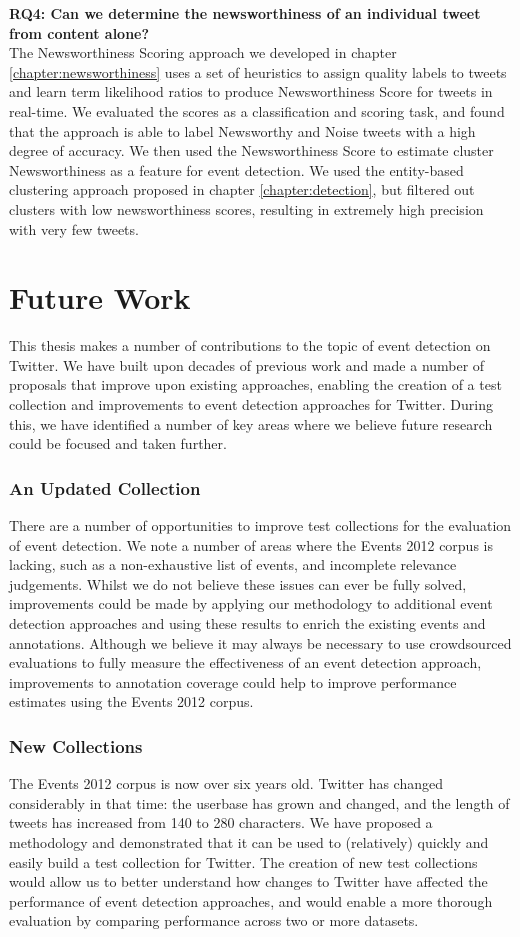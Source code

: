 \textbf{RQ4: Can we determine the newsworthiness of an individual tweet from content alone?} \\
The Newsworthiness Scoring approach we developed in chapter \ref{chapter:newsworthiness} uses a set of heuristics to assign quality labels to tweets and learn term likelihood ratios to produce Newsworthiness Score for tweets in real-time.
We evaluated the scores as a classification and scoring task, and found that the approach is able to label Newsworthy and Noise tweets with a high degree of accuracy.
We then used the Newsworthiness Score to estimate cluster Newsworthiness as a feature for event detection.
We used the entity-based clustering approach proposed in chapter \ref{chapter:detection}, but filtered out clusters with low newsworthiness scores, resulting in extremely high precision with very few tweets.

\section{Future Work}
This thesis makes a number of contributions to the topic of event detection on Twitter.
We have built upon decades of previous work and made a number of proposals that improve upon existing approaches, enabling the creation of a test collection and improvements to event detection approaches for Twitter.
During this, we have identified a number of key areas where we believe future research could be focused and taken further.

\subsubsection{An Updated Collection} There are a number of opportunities to improve  test collections for the evaluation of event detection.
We note a number of areas where the Events 2012 corpus is lacking, such as a non-exhaustive list of events, and incomplete relevance judgements.
Whilst we do not believe these issues can ever be fully solved, improvements could be made by applying our methodology to additional event detection approaches and using these results to enrich the existing events and annotations.
Although we believe it may always be necessary to use crowdsourced evaluations to fully measure the effectiveness of an event detection approach, improvements to annotation coverage could help to improve performance estimates using the Events 2012 corpus.

\subsubsection{New Collections}
The Events 2012 corpus is now over six years old.
Twitter has changed considerably in that time: the userbase has grown and changed, and the length of tweets has increased from 140 to 280 characters.
We have proposed a methodology and demonstrated that it can be used to (relatively) quickly and easily build a test collection for Twitter.
The creation of new test collections would allow us to better understand how changes to Twitter have affected the performance of event detection approaches, and would enable a more thorough evaluation by comparing performance across two or more datasets.


